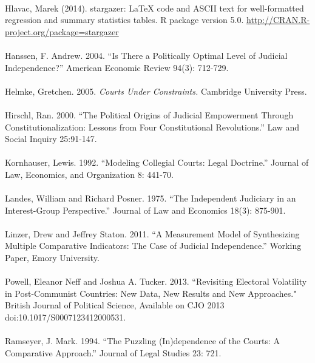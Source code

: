 \documentclass[12pt]{article}
\begin{document}
\\\noindent Hlavac, Marek (2014). stargazer: LaTeX code and ASCII text for well-formatted regression and summary statistics tables. R package version 5.0. \url{http://CRAN.R-project.org/package=stargazer}\\

\\\noindent Hanssen, F. Andrew. 2004. ``Is There a Politically Optimal Level of Judicial
Independence?'' American Economic Review 94(3): 712-729.\\

\\\noindent Helmke, Gretchen. 2005. \textit{Courts Under Constraints.} Cambridge University Press.\\

\\\noindent Hirschl, Ran. 2000. ``The Political Origins of Judicial Empowerment Through
Constitutionalization: Lessons from Four Constitutional Revolutions.'' Law and
Social Inquiry 25:91-147.\\

\\\noindent Kornhauser, Lewis. 1992. ``Modeling Collegial Courts: Legal Doctrine.'' Journal of Law, Economics, and Organization 8: 441-70.\\

\\\noindent Landes, William and Richard Posner. 1975. ``The Independent Judiciary in an Interest-Group Perspective.'' Journal of Law and Economics 18(3): 875-901.\\

\\\noindent Linzer, Drew and Jeffrey Staton. 2011. ``A Measurement Model of Synthesizing Multiple Comparative Indicators: The Case of Judicial Independence.'' Working Paper,
Emory University.\\

\\\noindent Powell, Eleanor Neff and Joshua A. Tucker. 2013. ``Revisiting Electoral Volatility in Post-Communist Countries: New Data, New Results and New Approaches." British Journal of Political Science, Available on CJO 2013 doi:10.1017/S0007123412000531.\\

\\\noindent Ramseyer, J. Mark. 1994. ``The Puzzling (In)dependence of the Courts: A Comparative Approach.'' Journal of Legal Studies 23: 721.\\
\end{document}
